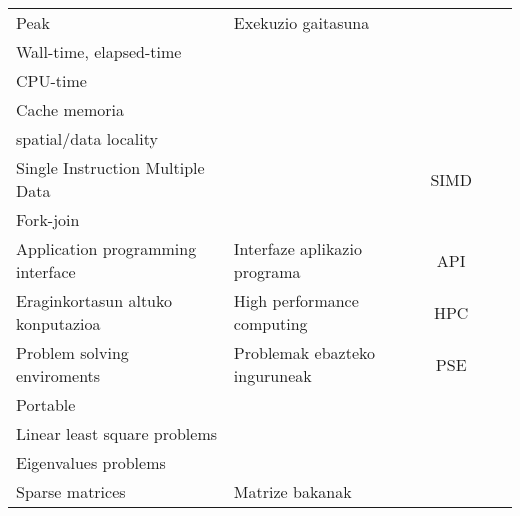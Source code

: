 \begin{table}
\begin{tabular}{ l l c c c }
 Peak                                    &  Exekuzio gaitasuna                   &             &                  \\
 Wall-time, elapsed-time                 &                                       &             &                  \\
 CPU-time                                &                                       &             &                  \\
 Cache memoria                           &                                       &             &                  \\ 
 spatial/data locality                   &                                       &             &                  \\
 Single Instruction Multiple Data        &                                       & SIMD        &                  \\
 Fork-join                               &                                       &             &                  \\
 Application programming interface       & Interfaze aplikazio programa          & API         &                  \\
 Eraginkortasun altuko konputazioa       & High performance computing            & HPC         &                  \\
 Problem solving enviroments             & Problemak ebazteko inguruneak         & PSE         &                  \\
 Portable                                &                                       &             &                  \\
 Linear least square problems            &                                       &             &                  \\
 Eigenvalues problems                    &                                       &             &                  \\
 Sparse matrices                         & Matrize bakanak                       &             &                  \\
 
                                                             
 
                                
 \hline
 \end{tabular}
\end{table}
